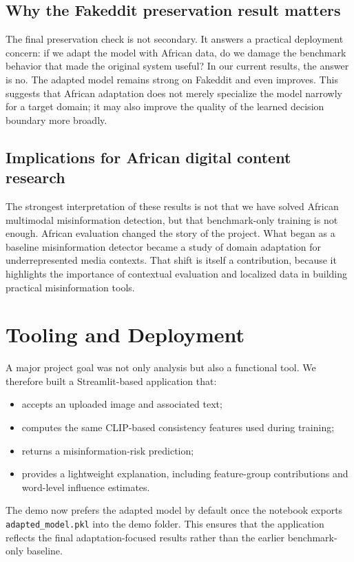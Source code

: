 \documentclass[a4paper,10.5pt,twoside]{article}
\begin{document}
\subsection{Why the Fakeddit preservation result matters}
The final preservation check is not secondary. It answers a practical deployment concern: if we adapt the model with African data, do we damage the benchmark behavior that made the original system useful? In our current results, the answer is no. The adapted model remains strong on Fakeddit and even improves. This suggests that African adaptation does not merely specialize the model narrowly for a target domain; it may also improve the quality of the learned decision boundary more broadly.

\subsection{Implications for African digital content research}
The strongest interpretation of these results is not that we have solved African multimodal misinformation detection, but that benchmark-only training is not enough. African evaluation changed the story of the project. What began as a baseline misinformation detector became a study of domain adaptation for underrepresented media contexts. That shift is itself a contribution, because it highlights the importance of contextual evaluation and localized data in building practical misinformation tools.

\section{Tooling and Deployment}
A major project goal was not only analysis but also a functional tool. We therefore built a Streamlit-based application that:
\begin{itemize}[leftmargin=1.5em]
    \item accepts an uploaded image and associated text;
    \item computes the same CLIP-based consistency features used during training;
    \item returns a misinformation-risk prediction;
    \item provides a lightweight explanation, including feature-group contributions and word-level influence estimates.
\end{itemize}

The demo now prefers the adapted model by default once the notebook exports \texttt{adapted\_model.pkl} into the demo folder. This ensures that the application reflects the final adaptation-focused results rather than the earlier benchmark-only baseline.
\end{document}
